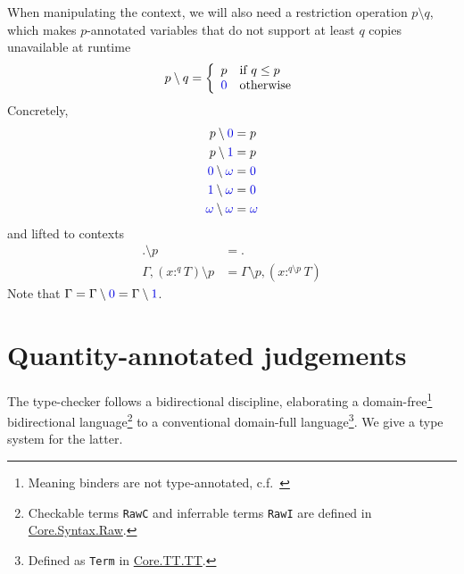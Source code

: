 \documentclass{article}
\newcommand{\OF}{:}
\newcommand{\OFq}[1]{\OF^{#1}}
\newcommand{\EMPTY}{.}
\newcommand{\zero}{{\textcolor{type}{0}}}
\newcommand{\one}{{\textcolor{type}{1}}}
\newcommand{\any}{{\textcolor{type}{\omega}}}
\newcommand{\restrictQ}[2]{#1 \setminus #2}
\newcommand{\restrictAny}[1]{\restrictQ {#1} \any}
\begin{document}
When manipulating the context, we will also need a restriction operation $\restrictQ p q$, which makes $p$-annotated variables that do not support at least $q$ copies unavailable at runtime
$$
\restrictQ p q =
  \left\{
    \begin{array}{ll}
      p & \text{if $q \leq p$} \\
      \zero & \text{otherwise}
    \end{array}
  \right.
$$
Concretely,
\begin{align*}
\restrictQ p \zero &= p\\
\restrictQ p \one &= p\\
\restrictAny \zero &= \zero\\
\restrictAny \one &= \zero\\
\restrictAny \any &= \any
\end{align*}
and lifted to contexts
\begin{align*}
\restrictQ {\EMPTY} p &= \EMPTY\\
\restrictQ {\Gamma, (x \OFq q T)} p &= \restrictQ \Gamma p, (x \OFq {\restrictQ q p} T)
\end{align*}
Note that $\Gamma = \restrictQ \Gamma \zero = \restrictQ \Gamma \one$.

\section{Quantity-annotated judgements}

The type-checker follows a bidirectional discipline, elaborating a domain-free\footnote{Meaning binders are not type-annotated, c.f.~\cite{Barthe2000}} bidirectional language\footnote{Checkable terms \texttt{RawC} and inferrable terms \texttt{RawI} are defined in \href{https://github.com/edwinb/Yaffle/blob/main/src/Core/Syntax/Raw.idr}{Core.Syntax.Raw}.} to a conventional domain-full language\footnote{Defined as \texttt{Term} in \href{https://github.com/edwinb/Yaffle/blob/main/src/Core/TT/TT.idr}{Core.TT.TT}.}. We give a type system for the latter.
\end{document}
